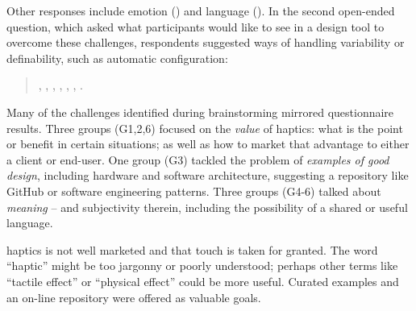 \noindent
Other responses include emotion () and language ().
In the second open-ended question, which asked what participants would like to see in a design tool to overcome these challenges,
respondents suggested ways of handling variability or  definability, such as automatic configuration: %

\begin{quote}
    ,
    ,
    ,
    ,
    ,
    ,
    .
\end{quote}


Many of the challenges identified during brainstorming mirrored questionnaire results.
Three groups (G1,2,6) focused on the \textit{value} of haptics: what is the point or benefit %
in certain situations; as well as how to market that advantage to either a client or end-user.  %
One group (G3) tackled the problem of \textit{examples of good design}, including hardware and software architecture, suggesting a repository like GitHub or software engineering patterns.
Three groups (G4-6) talked about \textit{meaning} -- and subjectivity therein, including the possibility of a shared or useful language.

haptics is not well marketed and that touch is taken for granted. The word ``haptic'' might be too jargonny or poorly understood; perhaps other terms like ``tactile effect'' or ``physical effect'' could be more useful.
Curated examples and an on-line repository were offered as valuable goals.



